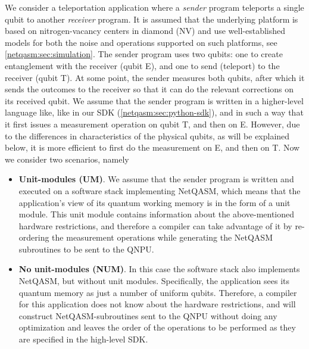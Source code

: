 We consider a teleportation application where a \textit{sender} program teleports a single qubit to another \textit{receiver} program.
It is assumed that the underlying platform is based on nitrogen-vacancy centers in diamond (NV) and use well-established models for both the noise and operations supported on such platforms, see \cref{netqasm:sec:simulation}.
The sender program uses two qubits: one to create entanglement with the receiver (qubit E), and one to send (teleport) to the receiver (qubit T).
At some point, the sender measures both qubits, after which it sends the outcomes to the receiver so that it can do the relevant corrections on its received qubit.
We assume that the sender program is written in a higher-level language like, like in our SDK (\cref{netqasm:sec:python-sdk}), and in such a way that it first issues a measurement operation on qubit T, and then on E. However, due to the differences in characteristics of the physical qubits, as will be explained below, it is more efficient to first do the measurement on E, and then on T. Now we consider two scenarios, namely
\begin{itemize}
  \item \textbf{Unit-modules (UM)}.
        We assume that the sender program is written and executed on a software stack implementing \ac{NetQASM}, which means that the application's view of its quantum working memory is in the form of a unit module.
        This unit module contains information about the above-mentioned hardware restrictions, and therefore a compiler can take advantage of it by re-ordering the measurement operations while generating the \ac{NetQASM} subroutines to be sent to the \ac{QNPU}.
  \item \textbf{No unit-modules (NUM)}.
        In this case the software stack also implements \ac{NetQASM}, but without unit modules.
        Specifically, the application sees its quantum memory as just a number of uniform qubits.
        Therefore, a compiler for this application does not know about the hardware restrictions, and will construct \ac{NetQASM}-subroutines sent to the \ac{QNPU} without doing any optimization and leaves the order of the operations to be performed as they are specified in the high-level SDK.
\end{itemize}

